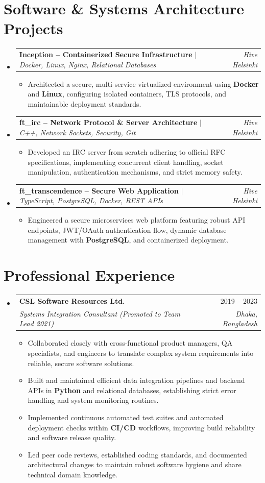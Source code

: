 \documentclass[a4paper,11pt]{article}
\makeatletter
\newcommand{\resumeItem}[1]{
  \item\small{{#1}}
}
\newcommand{\resumeSubheading}[4]{
  \vspace{-1pt}\item
    \begin{tabular*}{0.97\textwidth}[t]{l@{\extracolsep{\fill}}r}
      \textbf{#1} & \small #2 \\
      \textit{\small#3} & \textit{\small #4} \\
    \end{tabular*}\vspace{-6pt}
}
\newcommand{\resumeProjectHeading}[2]{
    \item
    \begin{tabular*}{0.97\textwidth}{l@{\extracolsep{\fill}}r}
      \small#1 & \textit{\small #2} \\
    \end{tabular*}\vspace{-6pt}
}
\newcommand{\resumeSubHeadingListStart}{\begin{itemize}[leftmargin=0.15in, label={}]}
\newcommand{\resumeSubHeadingListEnd}{\end{itemize}\vspace{-6pt}}
\newcommand{\resumeItemListStart}{
  \begin{itemize}[leftmargin=0.2in, itemsep=0pt, parsep=0pt, topsep=1pt]
}
\newcommand{\resumeItemListEnd}{\end{itemize}\vspace{-2pt}}
\makeatother
\begin{document}
\vspace{-6pt}

\section{Software \& Systems Architecture Projects}
\resumeSubHeadingListStart
    \resumeProjectHeading
      {\textbf{Inception -- Containerized Secure Infrastructure} $|$ \emph{Docker, Linux, Nginx, Relational Databases}}{Hive Helsinki}
      \resumeItemListStart
        \resumeItem{Architected a secure, multi-service virtualized environment using \textbf{Docker} and \textbf{Linux}, configuring isolated containers, TLS protocols, and maintainable deployment standards.}
      \resumeItemListEnd

    \resumeProjectHeading
      {\textbf{ft\_irc -- Network Protocol \& Server Architecture} $|$ \emph{C++, Network Sockets, Security, Git}}{Hive Helsinki}
      \resumeItemListStart
        \resumeItem{Developed an IRC server from scratch adhering to official RFC specifications, implementing concurrent client handling, socket manipulation, authentication mechanisms, and strict memory safety.}
      \resumeItemListEnd

    \resumeProjectHeading
      {\textbf{ft\_transcendence -- Secure Web Application} $|$ \emph{TypeScript, PostgreSQL, Docker, REST APIs}}{Hive Helsinki}
      \resumeItemListStart
        \resumeItem{Engineered a secure microservices web platform featuring robust API endpoints, JWT/OAuth authentication flow, dynamic database management with \textbf{PostgreSQL}, and containerized deployment.}
      \resumeItemListEnd
\resumeSubHeadingListEnd

\vspace{-4pt}

\section{Professional Experience}
\resumeSubHeadingListStart
\resumeSubheading
  {CSL Software Resources Ltd.}{2019 -- 2023}
  {Systems Integration Consultant (Promoted to Team Lead 2021)}{Dhaka, Bangladesh}
  \resumeItemListStart
    \resumeItem{Collaborated closely with cross-functional product managers, QA specialists, and engineers to translate complex system requirements into reliable, secure software solutions.}
    \resumeItem{Built and maintained efficient data integration pipelines and backend APIs in \textbf{Python} and relational databases, establishing strict error handling and system monitoring routines.}
    \resumeItem{Implemented continuous automated test suites and automated deployment checks within \textbf{CI/CD} workflows, improving build reliability and software release quality.}
    \resumeItem{Led peer code reviews, established coding standards, and documented architectural changes to maintain robust software hygiene and share technical domain knowledge.}
  \resumeItemListEnd
\resumeSubHeadingListEnd
\end{document}
